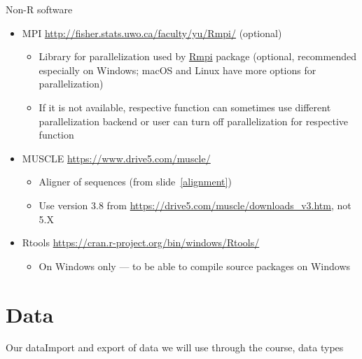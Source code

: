 \documentclass[compress, xelatex, 11pt, xcolor=svgnames, aspectratio=169, url={hyphens, lowtilde}]{beamer}
\renewcommand{\texttt}[1]{\colorbox{Beige}{{\ttfamily #1}}}
\begin{document}
\begin{frame}[allowframebreaks]{Non-R software}
\begin{itemize}
		\begin{itemize}
			\item Aligner of sequences (from slide~\ref{alignment})
		\end{itemize}
		\item MPI \url{http://fisher.stats.uwo.ca/faculty/yu/Rmpi/} (optional)
		\begin{itemize}
			\item Library for parallelization used by \href{https://CRAN.R-project.org/package=Rmpi}{Rmpi} package (optional, recommended especially on Windows; macOS and Linux have more options for parallelization)
			\item If it is not available, respective function can sometimes use different parallelization backend or user can turn off parallelization for respective function
		\end{itemize}
		\item MUSCLE \url{https://www.drive5.com/muscle/}
		\begin{itemize}
			\item Aligner of sequences (from slide~\ref{alignment})
			\item Use version 3.8 from \url{https://drive5.com/muscle/downloads_v3.htm}, not 5.X
		\end{itemize}
		\item Rtools \url{https://cran.r-project.org/bin/windows/Rtools/}
		\begin{itemize}
			\item \alert{On Windows only} --- to be able to compile source packages on Windows
		\end{itemize}
	\end{itemize}
\end{frame}

\section{Data}

\begin{frame}{Our data}{Import and export of data we will use through the course, data types}
	\tableofcontents[currentsection, sectionstyle=show/hide, hideothersubsections]
\end{frame}
\end{document}
